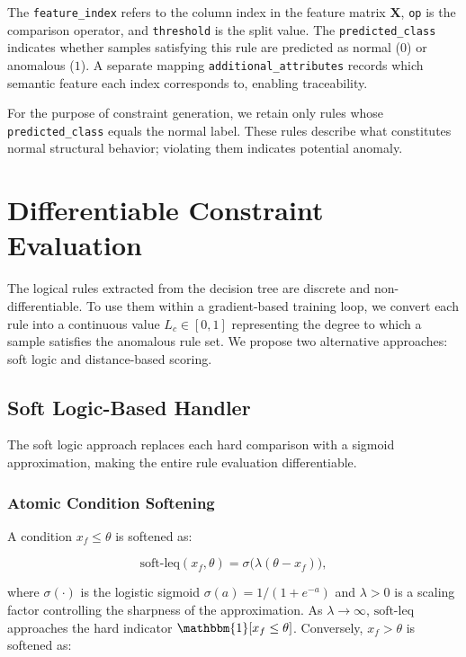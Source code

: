 The \texttt{feature\_index} refers to the column index in the feature matrix $\mathbf{X}$, \texttt{op} is the comparison operator, and \texttt{threshold} is the split value. The \texttt{predicted\_class} indicates whether samples satisfying this rule are predicted as normal ($0$) or anomalous ($1$). A separate mapping \texttt{additional\_attributes} records which semantic feature each index corresponds to, enabling traceability.

For the purpose of constraint generation, we retain only rules whose \texttt{predicted\_class} equals the normal label. These rules describe what constitutes normal structural behavior; violating them indicates potential anomaly.


\section{Differentiable Constraint Evaluation}
\label{sec:constraint_eval}

The logical rules extracted from the decision tree are discrete and non-differentiable. To use them within a gradient-based training loop, we convert each rule into a continuous value $L_c \in [0, 1]$ representing the degree to which a sample satisfies the anomalous rule set. We propose two alternative approaches: soft logic and distance-based scoring.

\subsection{Soft Logic-Based Handler}
\label{sec:soft_logic}

The soft logic approach replaces each hard comparison with a sigmoid approximation, making the entire rule evaluation differentiable.

\subsubsection{Atomic Condition Softening}

A condition $x_f \leq \theta$ is softened as:

\begin{equation}
\text{soft-leq}(x_f, \theta) = \sigma\bigl(\lambda (\theta - x_f)\bigr),
\label{eq:soft_leq}
\end{equation}

where $\sigma(\cdot)$ is the logistic sigmoid $\sigma(a) = 1 / (1 + e^{-a})$ and $\lambda > 0$ is a scaling factor controlling the sharpness of the approximation. As $\lambda \to \infty$, $\text{soft-leq}$ approaches the hard indicator $\mathbbm{1}[x_f \leq \theta]$. Conversely, $x_f > \theta$ is softened as:

